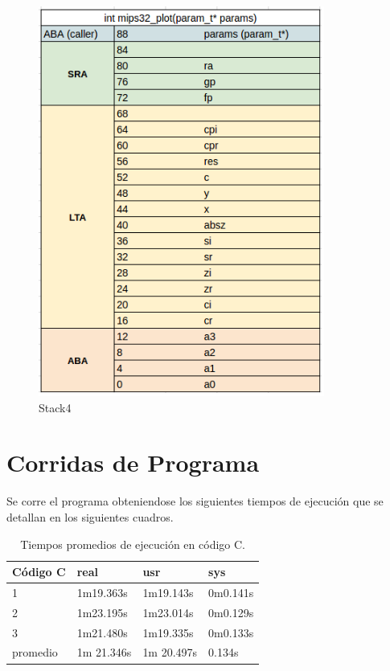 \documentclass{article}
\begin{document}
\begin{figure}[H]
	\centering
		\includegraphics[scale=0.4]{stack4.png}
	\caption{Stack4}
	\label{fig:stack4}
\end{figure}

\clearpage

\section{Corridas de Programa}

Se corre el programa obteniendose los siguientes tiempos de ejecución que se detallan en los siguientes cuadros.

\begin{table}[htbp]
\begin{center}
\begin{tabular}{|l|l|l|l|}
\hline
Código C & real & usr & sys \\
\hline \hline
1 & 1m19.363s & 1m19.143s & 0m0.141s \\ \hline
2 & 1m23.195s & 1m23.014s & 0m0.129s \\ \hline
3 & 1m21.480s & 1m19.335s & 0m0.133s \\ \hline
promedio & 1m 21.346s & 1m 20.497s & 0.134s
\end{tabular}
\caption{Tiempos promedios de ejecución en código C.}
\end{center}
\end{table}
\end{document}
